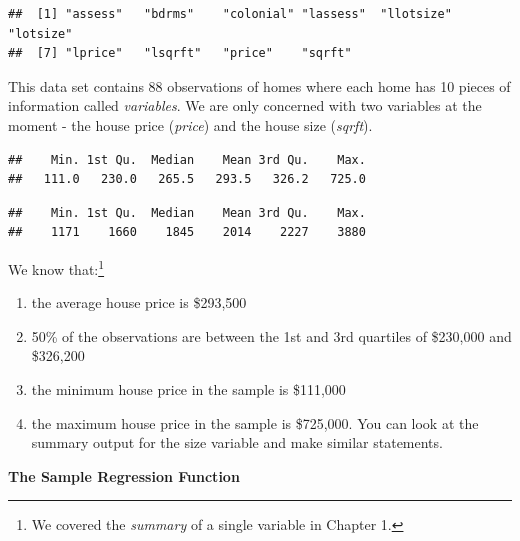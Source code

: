 \documentclass[
]{book}
\newenvironment{Shaded}{\begin{snugshade}}{\end{snugshade}}
\newcommand{\FunctionTok}[1]{\textcolor[rgb]{0.00,0.00,0.00}{#1}}
\newcommand{\NormalTok}[1]{#1}
\newcommand{\SpecialCharTok}[1]{\textcolor[rgb]{0.00,0.00,0.00}{#1}}
\begin{document}
\begin{verbatim}
##  [1] "assess"   "bdrms"    "colonial" "lassess"  "llotsize" "lotsize" 
##  [7] "lprice"   "lsqrft"   "price"    "sqrft"
\end{verbatim}

This data set contains 88 observations of homes where each home has 10 pieces of information called \emph{variables}. We are only concerned with two variables at the moment - the house price (\emph{price}) and the house size (\emph{sqrft}).

\begin{Shaded}
\end{Shaded}

\begin{verbatim}
##    Min. 1st Qu.  Median    Mean 3rd Qu.    Max. 
##   111.0   230.0   265.5   293.5   326.2   725.0
\end{verbatim}

\begin{Shaded}
\end{Shaded}

\begin{verbatim}
##    Min. 1st Qu.  Median    Mean 3rd Qu.    Max. 
##    1171    1660    1845    2014    2227    3880
\end{verbatim}

We know that:\footnote{We covered the \emph{summary} of a single variable in Chapter 1.}

\begin{enumerate}
\def\labelenumi{\arabic{enumi}.}
\item
  the average house price is \$293,500
\item
  50\% of the observations are between the 1st and 3rd quartiles of \$230,000 and \$326,200
\item
  the minimum house price in the sample is \$111,000
\item
  the maximum house price in the sample is \$725,000. You can look at the summary output for the size variable and make similar statements.
\end{enumerate}

\textbf{The Sample Regression Function}
\end{document}
